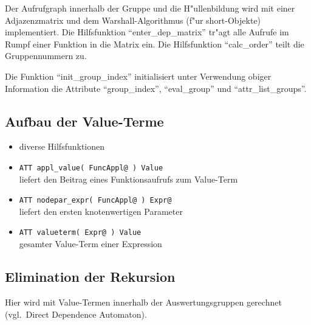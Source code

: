 Der Aufrufgraph innerhalb der Gruppe und die H"ullenbildung
wird mit einer Adjazenzmatrix und dem Warshall-Algorithmus (f"ur short-Objekte)
implementiert.
Die Hilfsfunktion "`enter\_dep\_matrix"' tr"agt alle Aufrufe im Rumpf einer
Funktion in die Matrix ein. Die Hilfsfunktion "`calc\_order"' teilt die
Gruppennummern zu.


Die Funktion "`init\_group\_index"' initialisiert unter Verwendung obiger Information
die Attribute "`group\_index"', "`eval\_group"' und "`attr\_list\_groups"'.



\subsection{Aufbau der Value-Terme}

\begin{itemize}
\item diverse Hilfsfunktionen
\item {\tt ATT appl\_value( FuncAppl@ ) Value}\\
liefert den Beitrag eines Funktionsaufrufs zum Value-Term
\item {\tt ATT nodepar\_expr( FuncAppl@ ) Expr@}\\
liefert den ersten knotenwertigen Parameter
\item {\tt ATT valueterm( Expr@ ) Value}\\
gesamter Value-Term einer Expression
\end{itemize}


\subsection{Elimination der Rekursion}

Hier wird mit Value-Termen innerhalb der Auswertungsgruppen gerechnet
(vgl.\ Direct Dependence Automaton).

